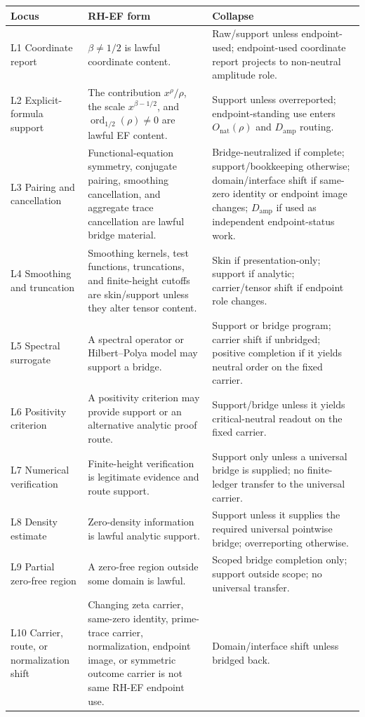 \documentclass[11pt]{article}
\newcommand{\Damp}{D_{\mathrm{amp}}}
\newcommand{\ordhalf}{\operatorname{ord}_{1/2}}
\newcommand{\Onat}{O_{\mathrm{nat}}}
\begin{document}
\begin{longtable}{L{0.18\textwidth}L{0.50\textwidth}L{0.23\textwidth}}
\toprule
\textbf{Locus} & \textbf{RH-EF form} & \textbf{Collapse}\\
\midrule
L1 Coordinate report & \(\beta\ne1/2\) is lawful coordinate content. & Raw/support unless endpoint-used; endpoint-used coordinate report projects to non-neutral amplitude role.\\
L2 Explicit-formula support & The contribution \(x^\rho/\rho\), the scale \(x^{\beta-1/2}\), and \(\ordhalf(\rho)\ne0\) are lawful EF content. & Support unless overreported; endpoint-standing use enters \(\Onat(\rho)\) and \(\Damp\) routing.\\
L3 Pairing and cancellation & Functional-equation symmetry, conjugate pairing, smoothing cancellation, and aggregate trace cancellation are lawful bridge material. & Bridge-neutralized if complete; support/bookkeeping otherwise; domain/interface shift if same-zero identity or endpoint image changes; \(\Damp\) if used as independent endpoint-status work.\\
L4 Smoothing and truncation & Smoothing kernels, test functions, truncations, and finite-height cutoffs are skin/support unless they alter tensor content. & Skin if presentation-only; support if analytic; carrier/tensor shift if endpoint role changes.\\
L5 Spectral surrogate & A spectral operator or Hilbert--Polya model may support a bridge. & Support or bridge program; carrier shift if unbridged; positive completion if it yields neutral order on the fixed carrier.\\
L6 Positivity criterion & A positivity criterion may provide support or an alternative analytic proof route. & Support/bridge unless it yields critical-neutral readout on the fixed carrier.\\
L7 Numerical verification & Finite-height verification is legitimate evidence and route support. & Support only unless a universal bridge is supplied; no finite-ledger transfer to the universal carrier.\\
L8 Density estimate & Zero-density information is lawful analytic support. & Support unless it supplies the required universal pointwise bridge; overreporting otherwise.\\
L9 Partial zero-free region & A zero-free region outside some domain is lawful. & Scoped bridge completion only; support outside scope; no universal transfer.\\
L10 Carrier, route, or normalization shift & Changing zeta carrier, same-zero identity, prime-trace carrier, normalization, endpoint image, or symmetric outcome carrier is not same RH-EF endpoint use. & Domain/interface shift unless bridged back.\\

\end{longtable}
\end{document}
